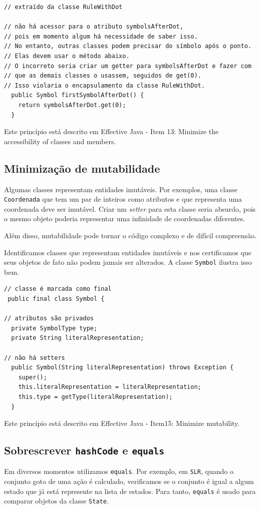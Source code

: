 \documentclass[11pt]{article}
\begin{document}
\begin{verbatim}
// extraído da classe RuleWithDot

// não há acessor para o atributo symbolsAfterDot,
// pois em momento algum há necessidade de saber isso.
// No entanto, outras classes podem precisar do símbolo após o ponto.
// Elas devem usar o método abaixo.
// O incorreto seria criar um getter para symbolsAfterDot e fazer com
// que as demais classes o usassem, seguidos de get(0).
// Isso violaria o encapsulamento da classe RuleWithDot.
  public Symbol firstSymbolAfterDot() {
    return symbolsAfterDot.get(0);
  }
\end{verbatim}

Este princípio está descrito em Effective Java - Item 13: Minimize the accessibility of classes and members.

\subsection{Minimização de mutabilidade}
\label{sec:orgheadline20}
Algumas classes representam entidades imutáveis. Por exemplos, uma classe \texttt{Coordenada}
que tem um par de inteiros como atributos e que representa uma coordenada deve
ser imutável. Criar um \emph{setter} para esta classe seria absurdo, pois o mesmo
objeto poderia representar uma infinidade de coordenadas diferentes.

Além disso, mutabilidade pode tornar o código complexo e de difícil compreensão.

Identificamos classes que representam entidades imutáveis e nos certificamos que
seus objetos de fato não podem jamais ser alterados. A classe \texttt{Symbol} ilustra
isso bem.

\begin{verbatim}
// classe é marcada como final
 public final class Symbol {

// atributos são privados
  private SymbolType type;
  private String literalRepresentation;

// não há setters
  public Symbol(String literalRepresentation) throws Exception {
    super();
    this.literalRepresentation = literalRepresentation;
    this.type = getType(literalRepresentation);
  }
\end{verbatim}
Este princípio está descrito em Effective Java - Item15: Minimize mutability.

\subsection{Sobrescrever \texttt{hashCode} e \texttt{equals}}
\label{sec:orgheadline21}
Em diversos momentos utilizamos \texttt{equals}. Por exemplo, em \texttt{SLR}, quando 
o conjunto goto de uma ação é calculado, verificamos se o conjunto é igual a algum
estado que já está represente na lista de estados. Para tanto, \texttt{equals} é usado
para comparar objetos da classe \texttt{State}.
\end{document}
